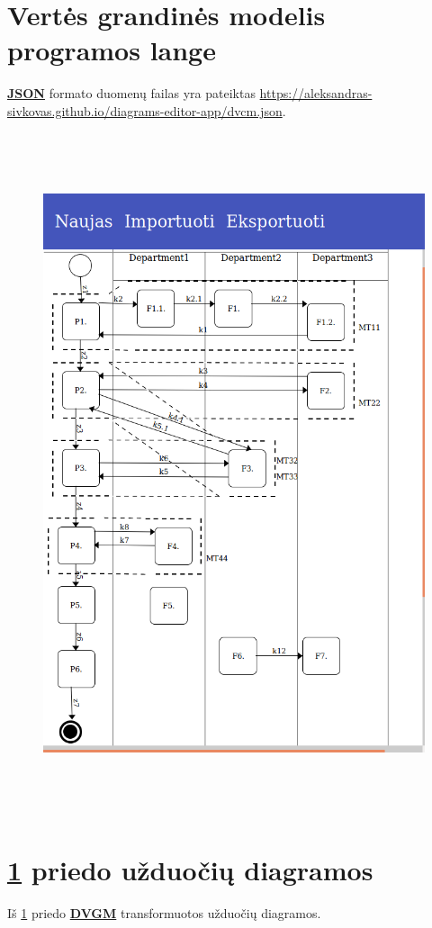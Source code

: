 \documentclass{VUMIFInfBakalaurinis}
\newcommand{\bhyperref}[2]{\hyperref[#1]{\textbf{#2}}}
\newcommand{\DVCM}{\bhyperref{section:dvcm}{DVGM}}
\newcommand{\JSON}{\bhyperref{def:json}{JSON}}
\begin{document}
\section{Vertės grandinės modelis programos lange} \label{appendix:dvcm_window}
\JSON{} formato duomenų failas yra pateiktas \href{https://aleksandras-sivkovas.github.io/diagrams-editor-app/dvcm.json}{https://aleksandras-sivkovas.github.io/diagrams-editor-app/dvcm.json}.
\begin{figure}[H]
    \centering
    \includegraphics[height=20cm]{img/dvcm_window}
\end{figure}

\section{\ref{appendix:dvcm_window} priedo užduočių diagramos} \label{appendix:use_cases_window}
Iš \ref{appendix:dvcm_window} priedo \DVCM{} transformuotos užduočių diagramos.
\end{document}

